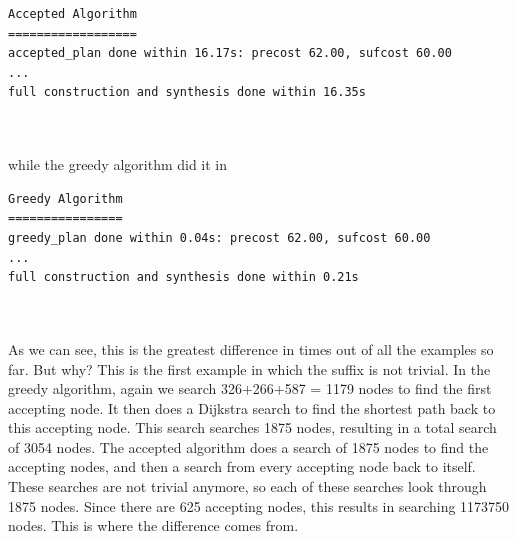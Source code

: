\begin{minipage}{\textwidth}
\begingroup
\fontsize{9pt}{12pt}\selectfont
\begin{lstlisting}
Accepted Algorithm
==================
accepted_plan done within 16.17s: precost 62.00, sufcost 60.00
...
full construction and synthesis done within 16.35s 
\end{lstlisting}
\endgroup
\end{minipage} \\ \\


while the greedy algorithm did it in \\


\begin{minipage}{\textwidth}
\begingroup
\fontsize{9pt}{12pt}\selectfont
\begin{lstlisting}
Greedy Algorithm
================
greedy_plan done within 0.04s: precost 62.00, sufcost 60.00
...
full construction and synthesis done within 0.21s 
\end{lstlisting}
\endgroup
\end{minipage} \\ \\


As we can see, this is the greatest difference in times out of all the examples so far. But why? This is the first example in which the suffix is not trivial. In the greedy algorithm, again we search 326+266+587 = 1179 nodes to find the first accepting node. It then does a Dijkstra search to find the shortest path back to this accepting node. This search searches 1875 nodes, resulting in a total search of 3054 nodes. The accepted algorithm does a search of 1875 nodes to find the accepting nodes, and then a search from every accepting node back to itself. These searches are not trivial anymore, so each of these searches look through 1875 nodes. Since there are 625 accepting nodes, this results in searching 1173750 nodes. This is where the difference comes from. 
